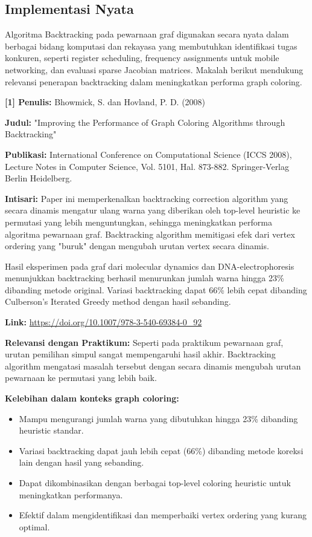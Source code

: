 \subsection{Implementasi Nyata}
Algoritma Backtracking pada pewarnaan graf digunakan secara nyata dalam berbagai bidang komputasi dan rekayasa yang membutuhkan identifikasi tugas konkuren, seperti register scheduling, frequency assignments untuk mobile networking, dan evaluasi sparse Jacobian matrices. Makalah berikut mendukung relevansi penerapan backtracking dalam meningkatkan performa graph coloring.

\vspace{1em}
\textbf{[1] Penulis:} Bhowmick, S. dan Hovland, P. D. (2008)

\textbf{Judul:} "Improving the Performance of Graph Coloring Algorithms through Backtracking"

\textbf{Publikasi:} International Conference on Computational Science (ICCS 2008), Lecture Notes in Computer Science, Vol. 5101, Hal. 873-882. Springer-Verlag Berlin Heidelberg.

\textbf{Intisari:} Paper ini memperkenalkan backtracking correction algorithm yang secara dinamis mengatur ulang warna yang diberikan oleh top-level heuristic ke permutasi yang lebih menguntungkan, sehingga meningkatkan performa algoritma pewarnaan graf. Backtracking algorithm memitigasi efek dari vertex ordering yang "buruk" dengan mengubah urutan vertex secara dinamis.

Hasil eksperimen pada graf dari molecular dynamics dan DNA-electrophoresis menunjukkan backtracking berhasil menurunkan jumlah warna hingga 23\% dibanding metode original. Variasi backtracking dapat 66\% lebih cepat dibanding Culberson's Iterated Greedy method dengan hasil sebanding.

\textbf{Link:} \url{https://doi.org/10.1007/978-3-540-69384-0_92}

\vspace{1em}
\textbf{Relevansi dengan Praktikum:} Seperti pada praktikum pewarnaan graf, urutan pemilihan simpul sangat mempengaruhi hasil akhir. Backtracking algorithm mengatasi masalah tersebut dengan secara dinamis mengubah urutan pewarnaan ke permutasi yang lebih baik.

\vspace{1em}
\textbf{Kelebihan dalam konteks graph coloring:}
\begin{itemize}
    \item Mampu mengurangi jumlah warna yang dibutuhkan hingga 23\% dibanding heuristic standar.
    \item Variasi backtracking dapat jauh lebih cepat (66\%) dibanding metode koreksi lain dengan hasil yang sebanding.
    \item Dapat dikombinasikan dengan berbagai top-level coloring heuristic untuk meningkatkan performanya.
    \item Efektif dalam mengidentifikasi dan memperbaiki vertex ordering yang kurang optimal.
\end{itemize}

